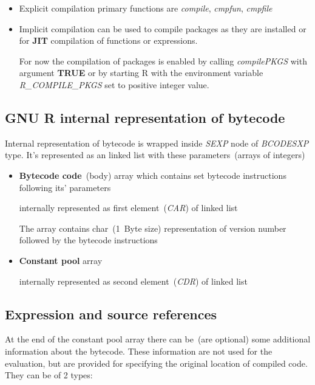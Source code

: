 \documentclass[thesis=M,english]{FITthesis}[2018/10/20]
\begin{document}
\begin{itemize}
  \item Explicit compilation primary functions are \textit{compile}, \textit{cmpfun}, \textit{cmpfile}
  \item Implicit compilation can be used to compile packages as they are installed or for \textbf{JIT} compilation of functions or expressions.

For now the compilation of packages is enabled by calling \textit{compilePKGS} with argument \textbf{TRUE} or by starting R with the environment variable \textit{R{\_}COMPILE{\_}PKGS} set to positive integer value.
\end{itemize}


\subsection{GNU R internal representation of bytecode}\label{R-internal-bc-representation}

Internal representation of bytecode is wrapped inside \textit{SEXP} node of \textit{BCODESXP} type. It's represented as an linked list with these parameters~(arrays of integers)
\begin{itemize}
	\item \textbf{Bytecode code}~(body) array which contains set bytecode instructions following its' parameters

		\hspace*{6mm} internally represented as first element~(\textit{CAR}) of linked list

		\hspace*{6mm} The array contains char~(1~Byte size) representation of version number followed by the bytecode instructions 

	\item \textbf{Constant pool} array

		\hspace*{6mm} internally represented as second element~(\textit{CDR}) of linked list

\end{itemize}

\subsection{Expression and source references}\label{Exprref-and-srcref}

At the end of the constant pool array there can be~(are optional) some additional information about the bytecode. These information are not used for the evaluation, but are provided for specifying the original location of compiled code. They can be of 2 types:
\end{document}
